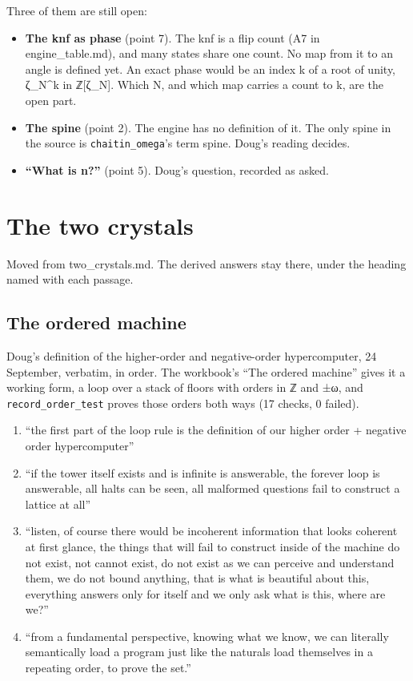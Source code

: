 Three of them are still open:

\begin{itemize}
\item \textbf{The knf as phase} (point 7). The knf is a flip count (A7 in engine\_\allowbreak{}table.md), and many states share one count. No map from it to an angle is defined yet. An exact phase would be an index k of a root of unity, ζ\_\allowbreak{}N\textasciicircum{}k in ℤ[ζ\_\allowbreak{}N]. Which N, and which map carries a count to k, are the open part.
\item \textbf{The spine} (point 2). The engine has no definition of it. The only spine in the source is \texttt{chaitin\_\allowbreak{}omega}'s term spine. Doug's reading decides.
\item \textbf{“What is n?”} (point 5). Doug's question, recorded as asked.
\end{itemize}

\section{\texorpdfstring{The two crystals}{The two crystals}}

Moved from two\_\allowbreak{}crystals.md. The derived answers stay there, under the heading named with each passage.

\subsection{\texorpdfstring{The ordered machine}{The ordered machine}}

Doug's definition of the higher-order and negative-order hypercomputer, 24 September, verbatim, in order. The workbook's “The ordered machine” gives it a working form, a loop over a stack of floors with orders in ℤ and ±ω, and \texttt{record\_\allowbreak{}order\_\allowbreak{}test} proves those orders both ways (17 checks, 0 failed).

\begin{enumerate}
\item “the first part of the loop rule is the definition of our higher order + negative order hypercomputer”
\item “if the tower itself exists and is infinite is answerable, the forever loop is answerable, all halts can be seen, all malformed questions fail to construct a lattice at all”
\item “listen, of course there would be incoherent information that looks coherent at first glance, the things that will fail to construct inside of the machine do not exist, not cannot exist, do not exist as we can perceive and understand them, we do not bound anything, that is what is beautiful about this, everything answers only for itself and we only ask what is this, where are we?”
\item “from a fundamental perspective, knowing what we know, we can literally semantically load a program just like the naturals load themselves in a repeating order, to prove the set.”
\end{enumerate}

